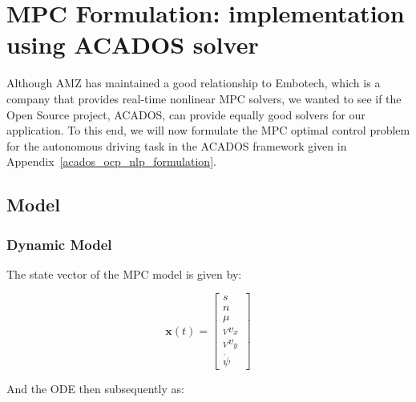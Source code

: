 \documentclass[
a4paper, %
10pt, %
notitlepage,
english]{CSUniSchoolLabReport}
\begin{document}
\chapter{MPC Formulation: implementation using ACADOS solver}

Although AMZ has maintained a good relationship to Embotech, which is a company that provides real-time nonlinear MPC solvers, we wanted to see if the Open Source project, ACADOS, can provide equally good solvers for our application. To this end, we will now formulate the MPC optimal control problem for the autonomous driving task in the ACADOS framework given in Appendix~\ref{acados_ocp_nlp_formulation}.

\section{Model}

\subsection{Dynamic Model}

The state vector of the MPC model is given by:

\begin{equation}
	\mathbf{x}(t) =
	\left[\begin{array}{c}

		s \\

		n \\

		\mu \\

		{}_Vv_x \\

		{}_Vv_y \\

		\dot{\psi}\;\;\;

	\end{array}\right]
\end{equation}

And the ODE then subsequently as:
\end{document}
